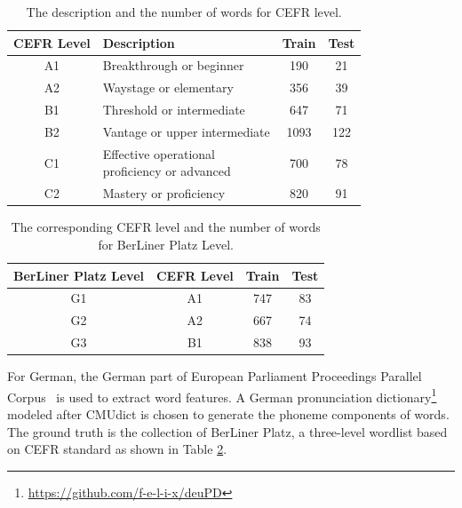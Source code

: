 \begin{table}[ht]
	\begin{center}
		\scriptsize
		\begin{tabular}{|c|l|c|c|}
			\hline
			\textbf{CEFR Level}&\textbf{Description}& \textbf{Train} & \textbf{Test}\\
			\hline
			A1&Breakthrough or beginner& 190&21\\
			\hline
			A2&Waystage or elementary& 356& 39\\
			\hline
			B1&Threshold or intermediate& 647&71\\
			\hline
			B2&Vantage or upper intermediate & 1093&122\\
			\hline
			C1&\tabincell{l}{Effective operational \\ proficiency or advanced} & 700& 78\\ 
			\hline
			C2&Mastery or proficiency& 820&91\\
			\hline
		\end{tabular}
	\end{center}
	\vspace{-0.25cm}
\caption{\label{tab:CEFR} The description and the number of words for CEFR level.}
\end{table}

\begin{table}[]
	\begin{center}
		\scriptsize
		\begin{tabular}{|c|c|c|c|}
			\hline
			\textbf{BerLiner Platz Level}&\textbf{CEFR Level}& \textbf{Train} & \textbf{Test}\\
			\hline
			G1 & A1 & 747 & 83\\
			\hline
			G2 &A2& 667 & 74\\
			\hline
			G3&B1& 838 & 93\\
			\hline
		\end{tabular}
	\end{center}
	\vspace{-0.25cm}
	\caption{\label{tab:German} The corresponding CEFR level and the number of words for BerLiner Platz Level.}
\end{table}

For German, the German part of European Parliament Proceedings Parallel Corpus~\cite{koehn2005europarl} is used to extract word features.
A German pronunciation dictionary\footnote{\url{https://github.com/f-e-l-i-x/deuPD}} modeled after CMUdict 
is chosen to generate the phoneme components of words.
The ground truth is the collection of BerLiner Platz, a three-level wordlist based on CEFR standard as shown in Table \ref{tab:German}. 

